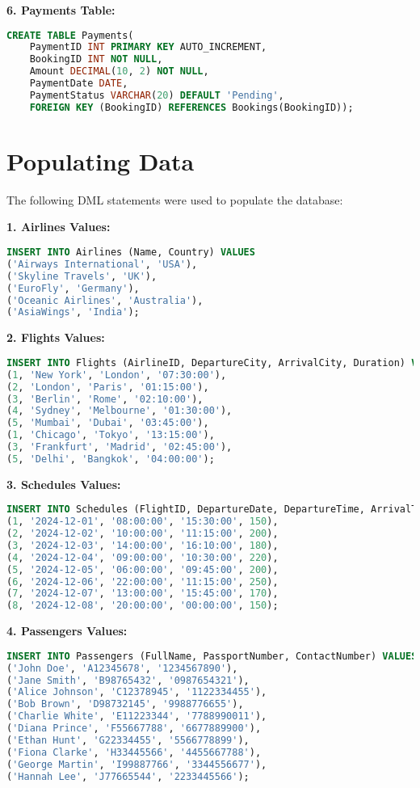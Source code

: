 \documentclass[14pt,a4paper]{extarticle}
\begin{document}
\textbf{6. Payments Table:}
\begin{lstlisting}[language=SQL]
CREATE TABLE Payments(
    PaymentID INT PRIMARY KEY AUTO_INCREMENT,
    BookingID INT NOT NULL,
    Amount DECIMAL(10, 2) NOT NULL,
    PaymentDate DATE,
    PaymentStatus VARCHAR(20) DEFAULT 'Pending',
    FOREIGN KEY (BookingID) REFERENCES Bookings(BookingID));
\end{lstlisting}

\section{Populating Data}
The following DML statements were used to populate the database:

\textbf{1. Airlines Values:}
\begin{lstlisting}[language=SQL]
INSERT INTO Airlines (Name, Country) VALUES
('Airways International', 'USA'),
('Skyline Travels', 'UK'),
('EuroFly', 'Germany'),
('Oceanic Airlines', 'Australia'),
('AsiaWings', 'India');
\end{lstlisting}

\textbf{2. Flights Values:}
\begin{lstlisting}[language=SQL]
INSERT INTO Flights (AirlineID, DepartureCity, ArrivalCity, Duration) VALUES
(1, 'New York', 'London', '07:30:00'),
(2, 'London', 'Paris', '01:15:00'),
(3, 'Berlin', 'Rome', '02:10:00'),
(4, 'Sydney', 'Melbourne', '01:30:00'),
(5, 'Mumbai', 'Dubai', '03:45:00'),
(1, 'Chicago', 'Tokyo', '13:15:00'),
(3, 'Frankfurt', 'Madrid', '02:45:00'),
(5, 'Delhi', 'Bangkok', '04:00:00');
\end{lstlisting}

\textbf{3. Schedules Values:}
\begin{lstlisting}[language=SQL]
INSERT INTO Schedules (FlightID, DepartureDate, DepartureTime, ArrivalTime, AvailableSeats) VALUES
(1, '2024-12-01', '08:00:00', '15:30:00', 150),
(2, '2024-12-02', '10:00:00', '11:15:00', 200),
(3, '2024-12-03', '14:00:00', '16:10:00', 180),
(4, '2024-12-04', '09:00:00', '10:30:00', 220),
(5, '2024-12-05', '06:00:00', '09:45:00', 200),
(6, '2024-12-06', '22:00:00', '11:15:00', 250),
(7, '2024-12-07', '13:00:00', '15:45:00', 170),
(8, '2024-12-08', '20:00:00', '00:00:00', 150);
\end{lstlisting}

\textbf{4. Passengers Values:}
\begin{lstlisting}[language=SQL]
INSERT INTO Passengers (FullName, PassportNumber, ContactNumber) VALUES
('John Doe', 'A12345678', '1234567890'),
('Jane Smith', 'B98765432', '0987654321'),
('Alice Johnson', 'C12378945', '1122334455'),
('Bob Brown', 'D98732145', '9988776655'),
('Charlie White', 'E11223344', '7788990011'),
('Diana Prince', 'F55667788', '6677889900'),
('Ethan Hunt', 'G22334455', '5566778899'),
('Fiona Clarke', 'H33445566', '4455667788'),
('George Martin', 'I99887766', '3344556677'),
('Hannah Lee', 'J77665544', '2233445566');
\end{lstlisting}
\end{document}
